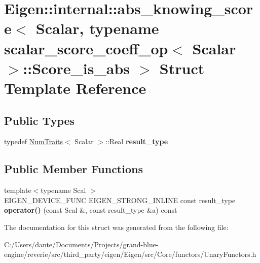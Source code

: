 \hypertarget{struct_eigen_1_1internal_1_1abs__knowing__score_3_01_scalar_00_01typename_01scalar__score__coeff5c3b449f8772ed2666062ac71b9807cd}{}\section{Eigen\+::internal\+::abs\+\_\+knowing\+\_\+score$<$ Scalar, typename scalar\+\_\+score\+\_\+coeff\+\_\+op$<$ Scalar $>$\+::Score\+\_\+is\+\_\+abs $>$ Struct Template Reference}
\label{struct_eigen_1_1internal_1_1abs__knowing__score_3_01_scalar_00_01typename_01scalar__score__coeff5c3b449f8772ed2666062ac71b9807cd}
\subsection*{Public Types}
\begin{DoxyCompactItemize}
\item 
\mbox{\label{struct_eigen_1_1internal_1_1abs__knowing__score_3_01_scalar_00_01typename_01scalar__score__coeff5c3b449f8772ed2666062ac71b9807cd_a56c4384e0a6242d2759f34a74e067785}} 
typedef \mbox{\hyperlink{struct_eigen_1_1_num_traits}{Num\+Traits}}$<$ Scalar $>$\+::Real {\bfseries result\+\_\+type}
\end{DoxyCompactItemize}
\subsection*{Public Member Functions}
\begin{DoxyCompactItemize}
\item 
\mbox{\label{struct_eigen_1_1internal_1_1abs__knowing__score_3_01_scalar_00_01typename_01scalar__score__coeff5c3b449f8772ed2666062ac71b9807cd_a89e1f41591ec9a2f8d674296403b6426}} 
{\footnotesize template$<$typename Scal $>$ }\\E\+I\+G\+E\+N\+\_\+\+D\+E\+V\+I\+C\+E\+\_\+\+F\+U\+NC E\+I\+G\+E\+N\+\_\+\+S\+T\+R\+O\+N\+G\+\_\+\+I\+N\+L\+I\+NE const result\+\_\+type {\bfseries operator()} (const Scal \&, const result\+\_\+type \&a) const
\end{DoxyCompactItemize}


The documentation for this struct was generated from the following file\+:\begin{DoxyCompactItemize}
\item 
C\+:/\+Users/dante/\+Documents/\+Projects/grand-\/blue-\/engine/reverie/src/third\+\_\+party/eigen/\+Eigen/src/\+Core/functors/Unary\+Functors.\+h\end{DoxyCompactItemize}
